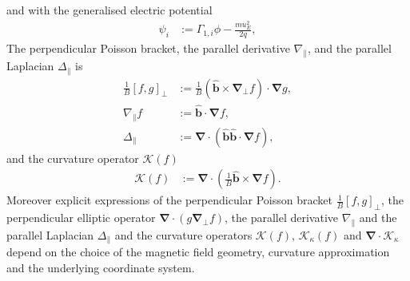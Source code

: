 \documentclass{hitec} %
\renewcommand{\vec}[1]{\boldsymbol{#1}}
\begin{document}
and with the generalised electric potential
\begin{align}
 \psi_i&:= \Gamma_{1,i} \phi - \frac{m u_E^2}{2 q},
\end{align}
The perpendicular Poisson bracket, the parallel derivative \(\nabla_\parallel\), and the parallel Laplacian \(\Delta_\parallel\) is
\begin{align}\label{eq:perppoiss}
 \frac{1}{B}\left[f,g\right]_\perp &:= \frac{1}{B}\left(\vec{\hat{b}} \times \vec{\nabla}_\perp f \right)\cdot \vec{\nabla} g, \\
 \nabla_\parallel f&:= \vec{\hat{b}}\cdot\vec{\nabla} f,  \\
 \Delta_\parallel &:= \vec{\nabla} \cdot ( \vec{\hat{b}} \vec{\hat{b}}\cdot\vec{\nabla} f ), 
\end{align}
and the curvature operator \(\mathcal{K}(f)\)
\begin{align}\label{eq:curvopgen}
\mathcal{K}(f)&:=\vec{\nabla} \cdot \left(\frac{1}{B} \vec{\hat{b}} \times \vec{\nabla} f \right).
\end{align}
Moreover explicit expressions of the perpendicular Poisson bracket \( \frac{1}{B}\left[f,g\right]_\perp\), the perpendicular elliptic operator \( \vec{\nabla}\cdot\left(g \vec{\nabla}_\perp f\right)\), 
the parallel derivative \(\nabla_\parallel\) and the parallel Laplacian \(\Delta_\parallel\) and  the curvature operators \(\mathcal{K}(f)\), 
\(\mathcal{K}_\kappa(f)\) and \(\vec{\nabla} \cdot  \vec{\mathcal{K}}_{\kappa} \)
depend on the choice of the magnetic field geometry, curvature approximation and the underlying coordinate system.
\end{document}
